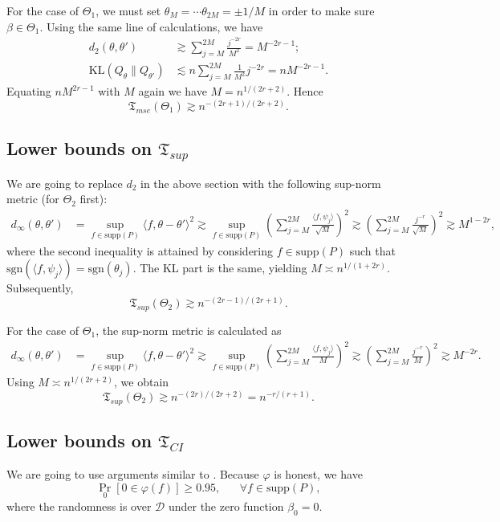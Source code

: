 \documentclass[11pt,a4paper]{article}
\theoremstyle{definition}
\theoremstyle{plain}
\theoremstyle{remark}
\begin{document}
For the case of $\Theta_1$, we must set $\theta_M=\cdots\theta_{2M}=\pm 1/M$ in order to make sure $\beta\in\Theta_1$. Using the same line of calculations, we have
\begin{align*}
d_2(\theta,\theta') &\gtrsim \sum_{j=M}^{2M} \frac{j^{-2r}}{M^2} = M^{-2r-1};\\
\mathrm{KL}(Q_{\theta}\|Q_{\theta'}) &\lesssim n\sum_{j=M}^{2M}\frac{1}{M^2} j^{-2r} = nM^{-2r-1}.
\end{align*}
Equating $nM^{2r-1}$ with $M$ again we have $M=n^{1/(2r+2)}$. Hence
$$
\mathfrak T_{mse}(\Theta_1) \gtrsim n^{-(2r+1)/(2r+2)}.
$$

\subsection{Lower bounds on $\mathfrak T_{sup}$}

We are going to replace $d_2$ in the above section with the following sup-norm metric (for $\Theta_2$ first):
\begin{align*}
d_{\infty}(\theta,\theta') &= \sup_{f\in\mathrm{supp}(P)}\langle f,\theta-\theta'\rangle^2 \gtrsim \sup_{f\in\mathrm{supp}(P)}\left(\sum_{j=M}^{2M}\frac{\langle f,\psi_j\rangle}{\sqrt{M}}\right)^2 \gtrsim \left(\sum_{j=M}^{2M}\frac{j^{-r}}{\sqrt{M}}\right)^2 \gtrsim M^{1-2r},
\end{align*}
where the second inequality is attained by considering $f\in\mathrm{supp}(P)$ such that $\mathrm{sgn}(\langle f,\psi_j\rangle) = \mathrm{sgn}(\theta_j)$.
The KL part is the same, yielding $M\asymp n^{1/(1+2r)}$. Subsequently, 
$$
\mathfrak T_{sup}(\Theta_2) \gtrsim n^{-(2r-1)/(2r+1)}.
$$

For the case of $\Theta_1$, the sup-norm metric is calculated as 
\begin{align*}
d_{\infty}(\theta,\theta') &= \sup_{f\in\mathrm{supp}(P)}\langle f,\theta-\theta'\rangle^2 \gtrsim \sup_{f\in\mathrm{supp}(P)}\left(\sum_{j=M}^{2M}\frac{\langle f,\psi_j\rangle}{{M}}\right)^2 \gtrsim \left(\sum_{j=M}^{2M}\frac{j^{-r}}{{M}}\right)^2 \gtrsim M^{-2r}.
\end{align*}
Using $M\asymp n^{1/(2r+2)}$, we obtain
$$
\mathfrak T_{sup}(\Theta_2) \gtrsim n^{-(2r)/(2r+2)} = n^{-r/(r+1)}.
$$

\subsection{Lower bounds on $\mathfrak T_{CI}$}

We are going to use arguments similar to \cite{cai2006adaptive}. Because $\varphi$ is honest, we have
$$
\Pr_0[0\in\varphi(f)] \geq 0.95, \;\;\;\;\;\;\forall f\in\mathrm{supp}(P),
$$
where the randomness is over $\mathcal D$ under the zero function $\beta_0=0$.
\end{document}
